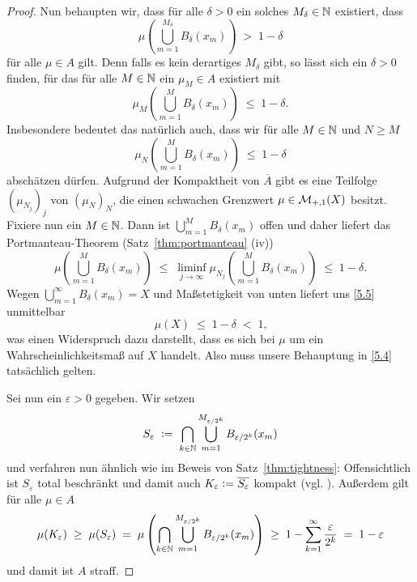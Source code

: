 \documentclass[../main/main.tex]{subfiles}
\begin{document}
\begin{proof}
		Nun behaupten wir, dass für alle $\delta > 0$ ein solches $M_\delta \in \mathbb{N}$ existiert, dass
		\[ \mu(\bigcup_{m=1}^{M_\delta} B_\delta(x_m)) \; > \; 1 - \delta \label{5.4} \tag{5.4} \]
		für alle $\mu \in A$ gilt. Denn falls es kein derartiges $M_\delta$ gibt, so lässt sich ein $\delta > 0$ finden, für das
		für alle $M \in \mathbb{N}$ ein $\mu_M \in A$ existiert mit
		\[ \mu_M(\bigcup_{m=1}^{M} B_\delta(x_m)) \; \leq \; 1 - \delta \text{.} \]
		Insbesondere bedeutet das natürlich auch, dass wir für alle $M \in \mathbb{N}$ und $N \geq M$ 
		\[ \mu_N(\bigcup_{m=1}^{M} B_\delta(x_m)) \; \leq \; 1 - \delta \]
		abschätzen dürfen. Aufgrund der Kompaktheit von $\overline{A}$ gibt es eine Teilfolge $(\mu_{N_j})_j$ von $(\mu_N)_N$, 
		die einen schwachen Grenzwert $\mu \in \mathcal{M}_{+,1}(X)$ besitzt. Fixiere nun ein $M \in \mathbb{N}$. 
		Dann ist $\bigcup_{m=1}^{M} B_\delta(x_m)$
		offen und daher liefert das Portmanteau-Theorem (Satz~\ref{thm:portmanteau} (iv))
		\[ \mu(\bigcup_{m=1}^{M} B_\delta(x_m)) 
		\; \leq \; \liminf_{j \to \infty} \mu_{N_j}(\bigcup_{m=1}^{M} B_\delta(x_m)) 
		\; \leq \; 1 - \delta \text{.} \label{5.5} \tag{5.5} \]
		Wegen $\bigcup_{m=1}^{\infty} B_\delta(x_m) = X$ und Maßstetigkeit von unten 
		liefert uns \eqref{5.5} unmittelbar 
		\[ \mu(X) \; \leq \; 1 - \delta \; < \; 1 \text{,} \]
		was einen Widerspruch dazu darstellt, dass es sich bei $\mu$ um ein 
		Wahrscheinlichkeitsmaß auf $X$ handelt. Also muss unsere Behauptung in \eqref{5.4} tatsächlich gelten.
		
		Sei nun ein $\varepsilon > 0$ gegeben. Wir setzen 
		\[ S_\varepsilon 
		\; \vcentcolon = \; \bigcap_{k \in \mathbb{N}} \bigcup_{m=1}^{M_{\varepsilon / 2^k}} 
		B_{\varepsilon / 2^k}(x_m) \]
		und verfahren nun ähnlich wie im Beweis von Satz~\ref{thm:tightness}: Offensichtlich ist $S_\varepsilon$ total beschränkt und damit auch 
		$ K_\varepsilon \vcentcolon = \overline{S_\varepsilon}$ kompakt (vgl. \cite[Satz 2.3.8]{Simon.2015}). 
		Außerdem gilt für alle $\mu \in A$
		\[
		\mu(K_\varepsilon) \; \geq \; \mu(S_\varepsilon) \; = \; \mu\left(\bigcap_{k \in \mathbb{N}} \bigcup_{m=1}^{M_{\varepsilon / 2^k}} 
		B_{\varepsilon / 2^k}(x_m)\right)
		\; \geq \; 1 - \sum_{k=1}^{\infty} \frac{\varepsilon}{2^k} \; = \; 1 - \varepsilon
		\]
		und damit ist $A$ straff.
	\end{proof}
	
\end{document}
